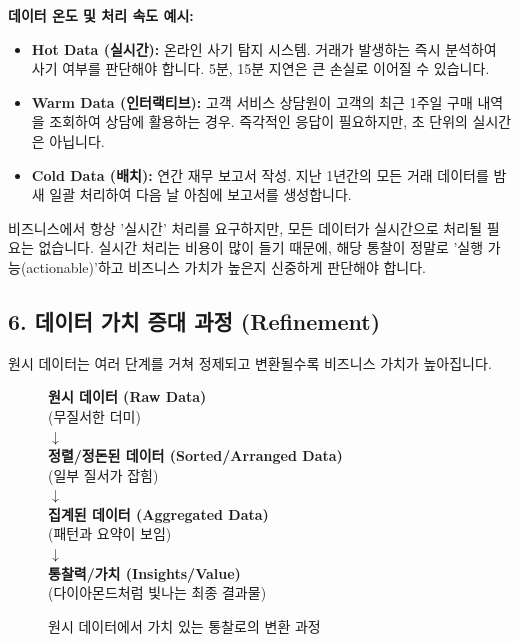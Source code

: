 \documentclass[11pt,a4paper]{article}
\begin{document}
\begin{examplebox}
\textbf{데이터 온도 및 처리 속도 예시:}
\begin{itemize}
    \item \textbf{Hot Data (실시간):} 온라인 사기 탐지 시스템. 거래가 발생하는 즉시 분석하여 사기 여부를 판단해야 합니다. 5분, 15분 지연은 큰 손실로 이어질 수 있습니다.
    \item \textbf{Warm Data (인터랙티브):} 고객 서비스 상담원이 고객의 최근 1주일 구매 내역을 조회하여 상담에 활용하는 경우. 즉각적인 응답이 필요하지만, 초 단위의 실시간은 아닙니다.
    \item \textbf{Cold Data (배치):} 연간 재무 보고서 작성. 지난 1년간의 모든 거래 데이터를 밤새 일괄 처리하여 다음 날 아침에 보고서를 생성합니다.
\end{itemize}
\end{examplebox}

\begin{warningbox}
비즈니스에서 항상 '실시간' 처리를 요구하지만, 모든 데이터가 실시간으로 처리될 필요는 없습니다. 실시간 처리는 비용이 많이 들기 때문에, 해당 통찰이 정말로 '실행 가능(actionable)'하고 비즈니스 가치가 높은지 신중하게 판단해야 합니다.
\end{warningbox}

\subsection*{6. 데이터 가치 증대 과정 (Refinement)}

원시 데이터는 여러 단계를 거쳐 정제되고 변환될수록 비즈니스 가치가 높아집니다.

\begin{figure}[h!]
    \centering
    \begin{tcolorbox}[colback=gray!10, colframe=gray!50!black, title={데이터 정제 과정 (개념도)}]
        \centering
        \textbf{원시 데이터 (Raw Data)} \\
        (무질서한 더미) \\
        $\downarrow$ \\
        \textbf{정렬/정돈된 데이터 (Sorted/Arranged Data)} \\
        (일부 질서가 잡힘) \\
        $\downarrow$ \\
        \textbf{집계된 데이터 (Aggregated Data)} \\
        (패턴과 요약이 보임) \\
        $\downarrow$ \\
        \textbf{통찰력/가치 (Insights/Value)} \\
        (다이아몬드처럼 빛나는 최종 결과물)
    \end{tcolorbox}
    \caption{원시 데이터에서 가치 있는 통찰로의 변환 과정}
    \label{fig:data_refinement}
\end{figure}
\end{document}
